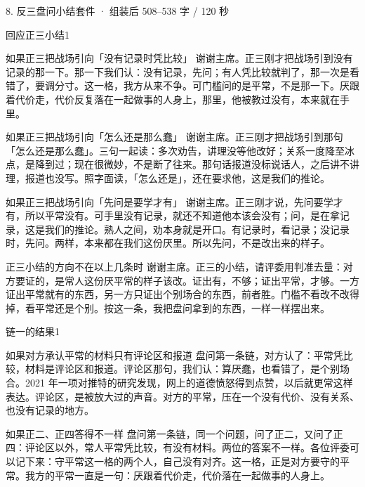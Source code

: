 \documentclass[script,con]{debate}
\begin{document}
\begin{kit}{8. 反三盘问小结}{套件 · 组装后 508–538 字 / 120 秒}
\begin{pick}{回应正三小结}{1}
\begin{module}{如果正三把战场引向「没有记录时凭比较」}
谢谢主席。正三刚才把战场引到没有记录的那一下。那一下我们认：没有记录，先问；有人凭比较就判了，那一次是看错了，要调分寸。这一格，我方从来不争。可门槛问的是平常，不是那一下。厌跟着代价走，代价反复落在一起做事的人身上，那里，他被教过没有，本来就在手里。
\end{module}
\begin{module}{如果正三把战场引向「怎么还是那么蠢」}
谢谢主席。正三刚才把战场引到那句「怎么还是那么蠢」。三句一起读：多次劝告，讲理没等他改好；关系一度降至冰点，是降到过；现在很微妙，不是断了往来。那句话报道没标说话人，之后讲不讲理，报道也没写。照字面读，「怎么还是」，还在要求他，这是我们的推论。
\end{module}
\begin{module}{如果正三把战场引向「先问是要学才有」}
谢谢主席。正三刚才说，先问要学才有，所以平常没有。可手里没有记录，就还不知道他本该会没有；问，是在拿记录，这是我们的推论。熟人之间，劝本身就是开口。有记录时，看记录；没记录时，先问。两样，本来都在我们这份厌里。所以先问，不是改出来的样子。
\end{module}
\begin{fallback}{正三小结的方向不在以上几条时}
谢谢主席。正三的小结，请评委用判准去量：对方要证的，是常人这份厌平常的样子该改。证出有，不够；证出平常，才够。一方证出平常就有的东西，另一方只证出个别场合的东西，前者胜。门槛不看改不改得掉，看平常还是个别。按这一条，我把盘问拿到的东西，一样一样摆出来。
\end{fallback}
\end{pick}
\begin{pick}{链一的结果}{1}
\begin{module}{如果对方承认平常的材料只有评论区和报道}
盘问第一条链，对方认了：平常凭比较，材料是评论区和报道。评论区那句，我们认：算厌蠢，也看错了，是个别场合。2021 年一项对推特的研究发现，网上的道德愤怒得到点赞，以后就更常这样表达。评论区，是被放大过的声音。对方的平常，压在一个没有代价、没有关系、也没有记录的地方。
\end{module}
\begin{module}{如果正二、正四答得不一样}
盘问第一条链，同一个问题，问了正二，又问了正四：评论区以外，常人平常凭比较，有没有材料。两位的答案不一样。各位评委可以记下来：守平常这一格的两个人，自己没有对齐。这一格，正是对方要守的平常。我方的平常一直是一句：厌跟着代价走，代价落在一起做事的人身上。

\end{module}
\end{pick}
\end{kit}
\end{document}
